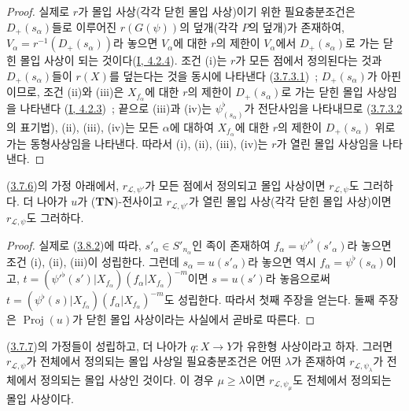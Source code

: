 \begin{proof}
실제로 $r$가 몰입 사상(각각 닫힌 몰입 사상)이기 위한 필요충분조건은
$D_+(s_\alpha)$들로 이루어진 $r(G(\psi))$의 덮개(각각 $P$의 덮개)가
존재하여, $V_\alpha=r^{-1}(D_+(s_\alpha))$라 놓으면 $V_\alpha$에 대한
$r$의 제한이 $V_\alpha$에서 $D_+(s_\alpha)$로 가는 닫힌 몰입 사상이
되는 것이다(\hyperref[I.4.2.4-ko]{I, 4.2.4}). 조건 (i)는
$r$가 모든 점에서 정의된다는 것과 $D_+(s_\alpha)$들이 $r(X)$를
덮는다는 것을 동시에 나타낸다
(\hyperref[II.3.7.3.1-ko]{3.7.3.1})~; $D_+(s_\alpha)$가 아핀이므로,
조건 (ii)와 (iii)은 $X_{f_\alpha}$에 대한 $r$의 제한이
$D_+(s_\alpha)$로 가는 닫힌 몰입 사상임을 나타낸다
(\hyperref[I.4.2.3-ko]{I, 4.2.3})~; 끝으로 (iii)과 (iv)는
$\psi_{(s_\alpha)}^\flat$가 전단사임을 나타내므로
(\hyperref[II.3.7.3.2-ko]{3.7.3.2}의 표기법), (ii), (iii), (iv)는 모든
$\alpha$에 대하여 $X_{f_\alpha}$에 대한 $r$의 제한이
$D_+(s_\alpha)$ 위로 가는 동형사상임을 나타낸다. 따라서 (i), (ii),
(iii), (iv)는 $r$가 열린 몰입 사상임을 나타낸다.
\end{proof}

\begin{corollary}[3.8.3]
\label{II.3.8.3-ko}
(\hyperref[II.3.7.6-ko]{3.7.6})의 가정 아래에서,
$r_{\mathcal{L},\psi'}$가 모든 점에서 정의되고 몰입 사상이면
$r_{\mathcal{L},\psi}$도 그러하다. 더 나아가 $u$가
(\textbf{TN})-전사이고 $r_{\mathcal{L},\psi'}$가 열린 몰입 사상(각각
닫힌 몰입 사상)이면 $r_{\mathcal{L},\psi}$도 그러하다.
\end{corollary}

\begin{proof}
실제로 (\hyperref[II.3.8.2-ko]{3.8.2})에 따라,
$s'_\alpha\in S'_{n_\alpha}$인 족이 존재하여
$f_\alpha=\psi'^\flat(s'_\alpha)$라 놓으면 조건 (i), (ii), (iii)이
성립한다. 그런데 $s_\alpha=u(s'_\alpha)$라 놓으면 역시
$f_\alpha=\psi^\flat(s_\alpha)$이고,
$t=(\psi'^\flat(s')|X_{f_\alpha})(f_\alpha|X_{f_\alpha})^{-m}$이면
$s=u(s')$라 놓음으로써
$t=(\psi^\flat(s)|X_{f_\alpha})(f_\alpha|X_{f_\alpha})^{-m}$도 성립한다.
따라서 첫째 주장을 얻는다. 둘째 주장은
$\operatorname{Proj}(u)$가 닫힌 몰입 사상이라는 사실에서 곧바로 따른다.
\end{proof}

\begin{proposition}[3.8.4]
\label{II.3.8.4-ko}
(\hyperref[II.3.7.7-ko]{3.7.7})의 가정들이 성립하고, 더 나아가
$q:X\to Y$가 유한형 사상이라고 하자. 그러면
$r_{\mathcal{L},\psi}$가 전체에서 정의되는 몰입 사상일 필요충분조건은
어떤 $\lambda$가 존재하여 $r_{\mathcal{L},\psi_\lambda}$가 전체에서
정의되는 몰입 사상인 것이다. 이 경우 $\mu\geq\lambda$이면
$r_{\mathcal{L},\psi_\mu}$도 전체에서 정의되는 몰입 사상이다.
\end{proposition}

